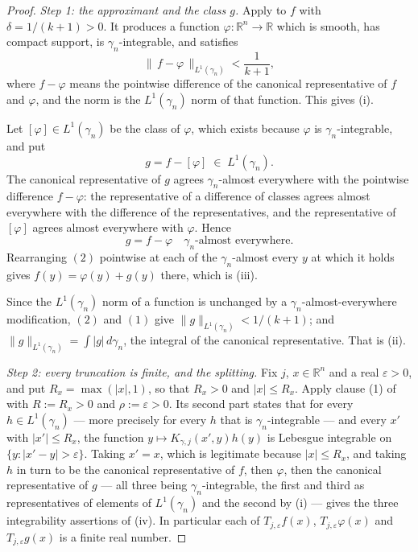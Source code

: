 \begin{proof}
\emph{Step 1: the approximant and the class $g$.}
Apply  to $f$ with
$\delta = 1/(k+1) > 0$.  It produces a function
$\varphi : \mathbb{R}^n \to \mathbb{R}$ which is smooth, has compact support,
is $\gamma_n$-integrable, and satisfies
\begin{equation*}
  \bigl\|\,f - \varphi\,\bigr\|_{L^1(\gamma_n)} < \frac1{k+1} , \tag{1}
\end{equation*}
where $f - \varphi$ means the pointwise difference of the canonical
representative of $f$ and $\varphi$, and the norm is the $L^1(\gamma_n)$ norm
of that function.  This gives (i).

Let $[\varphi] \in L^1(\gamma_n)$ be the class of $\varphi$, which exists
because $\varphi$ is $\gamma_n$-integrable, and put
\[
  g = f - [\varphi] \;\in\; L^1(\gamma_n) .
\]
The canonical representative of $g$ agrees $\gamma_n$-almost everywhere with
the pointwise difference $f - \varphi$: the representative of a difference of
classes agrees almost everywhere with the difference of the representatives,
and the representative of $[\varphi]$ agrees almost everywhere with $\varphi$.
Hence
\begin{equation*}
  g = f - \varphi \quad \gamma_n\text{-almost everywhere.} \tag{2}
\end{equation*}
Rearranging $(2)$ pointwise at each of the $\gamma_n$-almost every $y$
at which it holds gives $f(y) = \varphi(y) + g(y)$ there, which is (iii).

Since the $L^1(\gamma_n)$ norm of a function is unchanged by a
$\gamma_n$-almost-everywhere modification, $(2)$ and $(1)$ give
$\|g\|_{L^1(\gamma_n)} < 1/(k+1)$; and
$\|g\|_{L^1(\gamma_n)} = \int|g|\,d\gamma_n$, the integral of the canonical
representative.  That is (ii).

\emph{Step 2: every truncation is finite, and the splitting.}
Fix $j$, $x \in \mathbb{R}^n$ and a real $\varepsilon > 0$, and put
$R_x = \max(|x|,1)$, so that $R_x > 0$ and $|x| \leq R_x$.  Apply clause (1) of
 with $R := R_x > 0$ and
$\rho := \varepsilon > 0$.  Its second part states that for every
$h \in L^1(\gamma_n)$ --- more precisely for every $h$ that is
$\gamma_n$-integrable --- and every $x'$ with $|x'| \leq R_x$, the function
$y \mapsto K_{\gamma,j}(x',y)h(y)$ is Lebesgue integrable on
$\{y : |x'-y| > \varepsilon\}$.  Taking $x' = x$, which is legitimate because
$|x| \leq R_x$, and taking $h$ in turn to be the canonical representative of
$f$, then $\varphi$, then the canonical representative of $g$ --- all three
being $\gamma_n$-integrable, the first and third as representatives of elements
of $L^1(\gamma_n)$ and the second by (i) --- gives the three integrability
assertions of (iv).  In particular each of
$T_{j,\varepsilon}f(x)$, $T_{j,\varepsilon}\varphi(x)$ and
$T_{j,\varepsilon}g(x)$ is a finite real number.


\end{proof}
